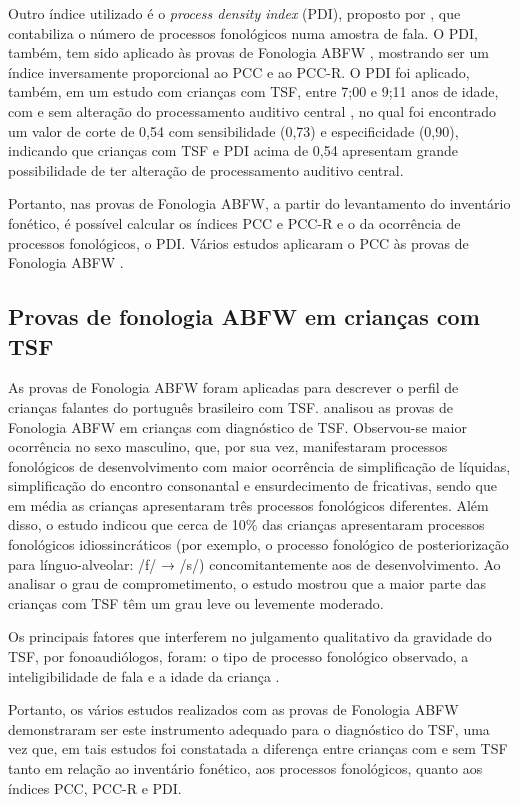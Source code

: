 \documentclass[output=paper,colorlinks,citecolor=brown,booklanguage=portuguese]{langscibook}
\begin{document}
Outro índice utilizado é o \emph{process density index} (PDI), proposto por \citet{Edwards1992}, que contabiliza o número de processos fonológicos numa amostra de fala. O PDI, também, tem sido aplicado às provas de Fonologia ABFW \citep{Wertzner2002, Wertzner2007}, mostrando ser um índice inversamente proporcional ao PCC e ao PCC-R. O PDI foi aplicado, também, em um estudo com crianças com TSF, entre 7;00 e 9;11 anos de idade, com e sem alteração do processamento auditivo central \citep{Barrozo2015}, no qual foi encontrado um valor de corte de 0,54 com sensibilidade (0,73) e especificidade (0,90), indicando que crianças com TSF e PDI acima de 0,54 apresentam grande possibilidade de ter alteração de processamento auditivo central.

Portanto, nas provas de Fonologia ABFW, a partir do levantamento do inventário fonético, é possível calcular os índices PCC e PCC-R e o da ocorrência de processos fonológicos, o PDI. Vários estudos aplicaram o PCC às provas de Fonologia ABFW \citep{Barrozo2015, Barrozo2017, Castro2011, Wertzner2012}. 


\subsection{Provas de fonologia ABFW em crianças com TSF}
As provas de Fonologia ABFW foram aplicadas para descrever o perfil de crianças falantes do português brasileiro com TSF. \citet{Wertzner2002} analisou as provas de Fonologia ABFW em crianças com diagnóstico de TSF. Observou-se maior ocorrência no sexo masculino, que, por sua vez, manifestaram processos fonológicos de desenvolvimento com maior ocorrência de simplificação de líquidas, simplificação do encontro consonantal e ensurdecimento de fricativas, sendo que em média as crianças apresentaram três processos fonológicos diferentes. Além disso, o estudo indicou que cerca de 10\% das crianças apresentaram processos fonológicos idiossincráticos (por exemplo, o processo fonológico de posteriorização para línguo-alveolar: /f/ → /s/) concomitantemente aos de desenvolvimento. Ao analisar o grau de comprometimento, o estudo mostrou que a maior parte das crianças com TSF têm um grau leve ou levemente moderado.

Os principais fatores que interferem no julgamento qualitativo da gravidade do TSF, por fonoaudiólogos, foram: o tipo de processo fonológico observado, a inteligibilidade de fala e a idade da criança \citep{Wertzner2002, Wertzner2005}.

Portanto, os vários estudos realizados com as provas de Fonologia ABFW demonstraram ser este instrumento adequado para o diagnóstico do TSF, uma vez que, em tais estudos foi constatada a diferença entre crianças com e sem TSF tanto em relação ao inventário fonético, aos processos fonológicos, quanto aos índices PCC, PCC-R e PDI.
\end{document}

